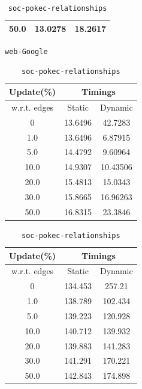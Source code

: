\begin{table}[H]
{\begin{tabular}{|c|c|c|}
        50.0 & 13.0278 & 18.2617 \\
        \hline
    \end{tabular}
}
\hfill
\parbox{0.45\linewidth}{
    \vspace{1.5em}
    \centering
    \caption{\texttt{web-Google}}
    \label{tab:web-Google}
    \begin{tabular}{|c|c|c|}
        \hline
        \textbf{Update(\%)} & \multicolumn{2}{c|}{\textbf{Timings}} \\
        \hline
        w.r.t. edges & Static &  Dynamic \\
        \hline
        0 & 13.6496 & 42.7283 \\
        1.0 & 13.6496 & 6.87915 \\
        5.0 & 14.4792 & 9.60964 \\
        10.0 & 14.9307 & 10.43506 \\
        20.0 & 15.4813 & 15.0343 \\
        30.0 & 15.8665 & 16.96263 \\
        50.0 & 16.8315 & 23.3846 \\
        \hline
    \end{tabular}
}
\hfill
\parbox{0.45\linewidth}{
    \vspace{1.5em}
    \centering
    \caption{\texttt{soc-pokec-relationships}}
    \label{tab:soc-pokec-relationships}
    \begin{tabular}{|c|c|c|}
        \hline
        \textbf{Update(\%)} & \multicolumn{2}{c|}{\textbf{Timings}} \\
        \hline
        w.r.t. edges & Static &  Dynamic \\
        \hline
        0 & 134.453 & 257.21 \\
        1.0 & 138.789 & 102.434 \\
        5.0 & 139.223 & 120.928 \\
        10.0 & 140.712 & 139.932 \\
        20.0 & 139.883 & 141.283 \\
        30.0 & 141.291 & 170.221 \\
        50.0 & 142.843 & 174.898 \\
        \hline
    \end{tabular}
}
\hfill
\end{table}

